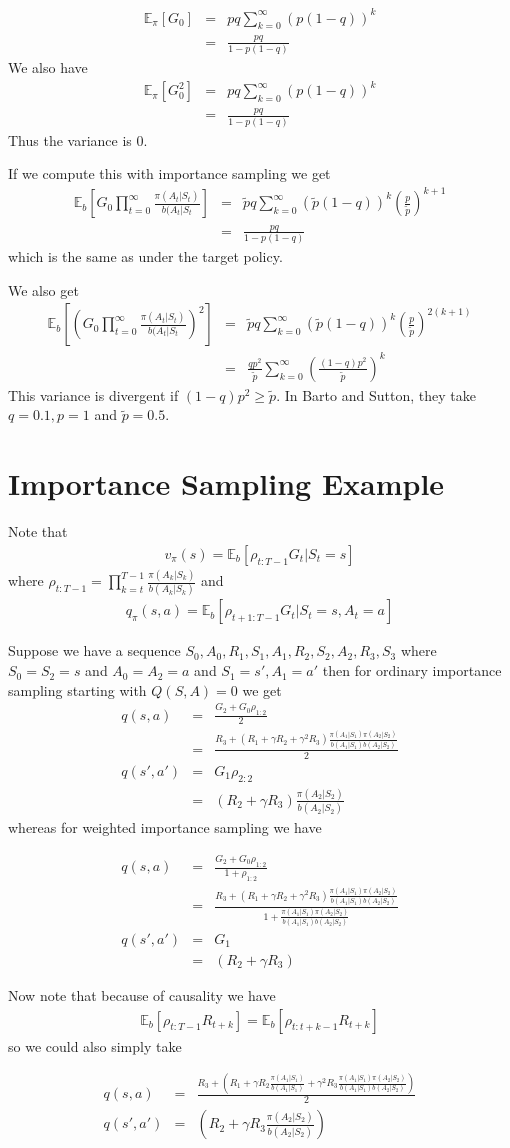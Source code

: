 \documentclass[11pt,a4paper]{article}
\newcommand\bea{\begin{eqnarray}}
\newcommand\eea{\end{eqnarray}}
\newcommand{\nn}{\nonumber \\}
\begin{document}
\bea
\mathbb E_\pi[G_0] &=& pq \sum_{k=0}^\infty (p (1-q))^k \nn
&=& \frac{pq}{1-p(1-q)}
\eea
We also have
\bea
\mathbb E_\pi[G_0^2] &=& pq \sum_{k=0}^\infty (p (1-q))^k \nn
&=& \frac{pq}{1-p(1-q)}
\eea
Thus the variance is 0.

If we compute this with importance sampling we get
\bea
\mathbb E_b[G_0 \prod_{t=0}^\infty \frac{\pi(A_t|S_t)}{b(A_t|S_t}] &=& \tilde pq \sum_{k=0}^\infty (\tilde p (1-q))^k \left( \frac{p}{\tilde p} \right)^{k+1} \nn
&=& \frac{pq}{1-p(1-q)}
\eea
which is the same as under the target policy.

We also get
\bea
\mathbb E_b[\left(G_0 \prod_{t=0}^\infty \frac{\pi(A_t|S_t)}{b(A_t|S_t}\right)^2] &=& \tilde pq \sum_{k=0}^\infty (\tilde p (1-q))^k \left( \frac{p}{\tilde p} \right)^{2(k+1)} \nn
&=& \frac{qp^2}{\tilde p} \sum_{k=0}^\infty \left( \frac{(1-q) p^2}{\tilde p}\right)^k
\eea
This variance is divergent if $(1-q)p^2 \ge \tilde p$. In Barto and Sutton, they take $q=0.1, p=1$ and $\tilde p=0.5$.


\appendix

\section{Importance Sampling Example}
Note that
\bea
v_\pi(s) = \mathbb E_b [ \rho_{t:T-1} G_t | S_t=s]
\eea
where $\rho_{t:T-1} = \prod_{k=t}^{T-1} \frac{\pi(A_k|S_k)}{b(A_k|S_k)}$ and
\bea
q_\pi(s,a) = \mathbb E_b [ \rho_{t+1:T-1} G_t | S_t=s, A_t=a]
\eea


Suppose we have a sequence $S_0,A_0,R_1,S_1,A_1,R_2,S_2,A_2,R_3,S_3$ where $S_0=S_2=s$ and $A_0=A_2=a$ and $S_1=s',A_1=a'$ then for ordinary importance sampling starting with $Q(S,A)=0$ we get
\bea
q(s,a) &=& \frac{G_2 + G_0 \rho_{1:2}}{2} \nn
&=&  \frac{ R_3 + (R_1 + \gamma R_2 + \gamma^2 R_3) \frac{\pi(A_1|S_1)\pi(A_2|S_2)}{b(A_1|S_1)b(A_2|S_2)}}{2} \\
q(s',a') &=& G_1 \rho_{2:2} \nn
&=& (R_2 + \gamma R_3) \frac{\pi(A_2|S_2)}{b(A_2|S_2)}
\eea
whereas for weighted importance sampling we have

\bea
q(s,a) &=&  \frac{G_2 + G_0 \rho_{1:2}}{1+\rho_{1:2}} \nn
&=&\frac{ R_3 + (R_1 + \gamma R_2 + \gamma^2 R_3) \frac{\pi(A_1|S_1)\pi(A_2|S_2)}{b(A_1|S_1)b(A_2|S_2)}}{1+\frac{\pi(A_1|S_1)\pi(A_2|S_2)}{b(A_1|S_1)b(A_2|S_2)}} \\
q(s',a') &=& G_1 \nn
&=& (R_2 + \gamma R_3)
\eea

Now note that because of causality we have
\bea
\mathbb E_b [ \rho_{t:T-1}R_{t+k} ] = \mathbb E_b [ \rho_{t:t+k-1}R_{t+k} ]
\eea
so we could also simply take

\bea
q(s,a) &=&  \frac{ R_3 + (R_1 + \gamma R_2 \frac{\pi(A_1|S_1)}{b(A_1|S_1)} + \gamma^2 R_3 \frac{\pi(A_1|S_1)\pi(A_2|S_2)}{b(A_1|S_1)b(A_2|S_2)} ) }{2} \\
q(s',a') &=& (R_2 + \gamma R_3 \frac{\pi(A_2|S_2)}{b(A_2|S_2)})
\eea
\end{document}
